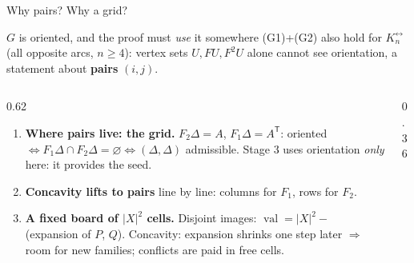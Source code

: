 \documentclass[aspectratio=169,11pt]{beamer}
\newcommand{\abs}[1]{\lvert #1\rvert}
\newcommand{\val}{\operatorname{val}}
\begin{document}
\begin{frame}{Why pairs? Why a grid?}
\begin{alertblock}{$G$ is oriented, and the proof must \emph{use} it somewhere}
\footnotesize (G1)+(G2) also hold for $K_n^{\leftrightarrow}$ (all opposite arcs, $n\ge4$): vertex sets
$U,FU,F^2U$ alone cannot see orientation, a statement about \textbf{pairs} $(i,j)$.
\end{alertblock}
\vspace{-3pt}
\begin{columns}[T]
\begin{column}{0.62\textwidth}
\small
\begin{enumerate}\setlength{\itemsep}{2pt}
\item \textbf{Where pairs live: the grid.} $F_2\Delta=A$, $F_1\Delta=A^{\mathsf T}$:
oriented $\iff F_1\Delta\cap F_2\Delta=\varnothing\iff(\Delta,\Delta)$ admissible.
Stage 3 uses orientation \emph{only} here: it provides the seed.
\item \textbf{Concavity lifts to pairs} line by line:
columns for $F_1$, rows for $F_2$.
\item \textbf{A fixed board of $\abs X^2$ cells.} Disjoint images:
$\val=\abs X^2-$ (expansion of $P$, $Q$).
Concavity: expansion shrinks one step later $\Rightarrow$ room for new families;
conflicts are paid in free cells.
\end{enumerate}
\end{column}
\begin{column}{0.36\textwidth}
\centering
{}
\end{column}
\end{columns}
\end{frame}
\end{document}

